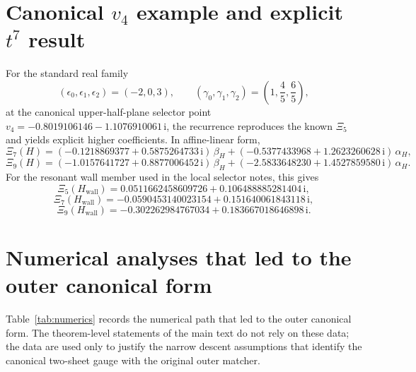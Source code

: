 \documentclass[11pt]{article}
\newcommand{\ii}{\mathrm{i}}
\begin{document}
\section{Canonical $v_4$ example and explicit $t^7$ result}
For the standard real family
\begin{equation}
 (\epsilon_0,\epsilon_1,\epsilon_2)=(-2,0,3),\qquad (\gamma_0,\gamma_1,\gamma_2)=\left(1,\frac45,\frac65\right),
\end{equation}
at the canonical upper-half-plane selector point $v_4=-0.8019106146-1.1076910061\,\ii$, the recurrence reproduces the known $\Xi_5$ and yields explicit higher coefficients. In affine-linear form,
\begin{equation}
 \Xi_7(H)=(-0.1218869377+0.5875264733\,\ii)\,\beta_H+(-0.5377433968+1.2623260628\,\ii)\,\alpha_H,
\end{equation}
\begin{equation}
 \Xi_9(H)=(-1.0157641727+0.8877006452\,\ii)\,\beta_H+(-2.5833648230+1.4527859580\,\ii)\,\alpha_H.
\end{equation}
For the resonant wall member used in the local selector notes, this gives
\begin{equation}
 \Xi_5(H_{\mathrm{wall}})=0.0511662458609726+0.106488885281404\,\ii,
\end{equation}
\begin{equation}
 \Xi_7(H_{\mathrm{wall}})=-0.0590453140023154+0.151640061843118\,\ii,
\end{equation}
\begin{equation}
 \Xi_9(H_{\mathrm{wall}})=-0.302262984767034+0.183667018646898\,\ii.
\end{equation}

\section{Numerical analyses that led to the outer canonical form}
\label{sec:numerics}
Table~\ref{tab:numerics} records the numerical path that led to the outer canonical form. The theorem-level statements of the main text do not rely on these data; the data are used only to justify the narrow descent assumptions that identify the canonical two-sheet gauge with the original outer matcher.
\end{document}
